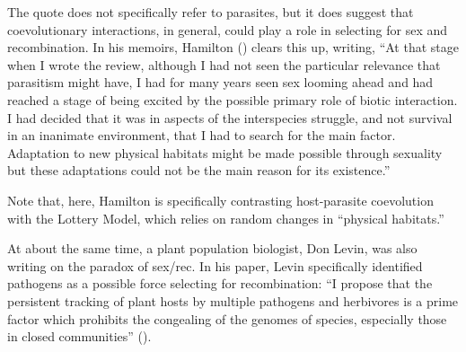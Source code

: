 \documentclass[
  letterpaper,
]{book}
\begin{document}
The quote does not specifically refer to parasites, but it does suggest
that coevolutionary interactions, in general, could play a role in
selecting for sex and recombination. In his memoirs, Hamilton
() clears this up, writing, ``At that
stage when I wrote the review, although I had not seen the particular
relevance that parasitism might have, I had for many years seen sex
looming ahead and had reached a stage of being excited by the possible
primary role of biotic interaction. I had decided that it was in aspects
of the interspecies struggle, and not survival in an inanimate
environment, that I had to search for the main factor. Adaptation to new
physical habitats might be made possible through sexuality but these
adaptations could not be the main reason for its existence.''

Note that, here, Hamilton is specifically contrasting host-parasite
coevolution with the Lottery Model, which relies on random changes in
``physical habitats.''

At about the same time, a plant population biologist, Don Levin, was
also writing on the paradox of sex/rec. In his paper, Levin specifically
identified pathogens as a possible force selecting for recombination:
``I propose that the persistent tracking of plant hosts by multiple
pathogens and herbivores is a prime factor which prohibits the
congealing of the genomes of species, especially those in closed
communities'' ().
\end{document}
